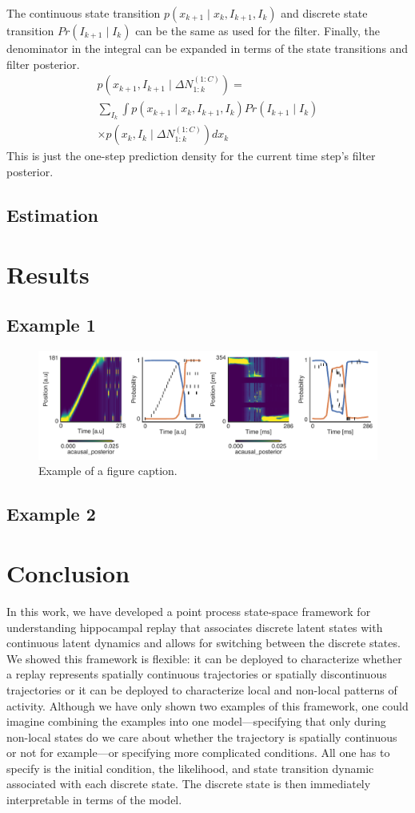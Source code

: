 \documentclass[conference]{IEEEtran}
\begin{document}
The continuous state transition $p(x_{k+1} \mid x_{k}, I_{k+1}, I_{k})$ and discrete state transition $Pr(I_{k+1} \mid I_{k})$ can be the same as used for the filter. Finally, the denominator in the integral can be expanded in terms of the state transitions and filter posterior.
\begin{multline}
p(x_{k+1}, I_{k+1} \mid \Delta N_{1:k}^{(1:C)}) = \\
\sum_{I_{k}} \int p(x_{k+1} \mid x_{k}, I_{k+1}, I_{k}) Pr(I_{k+1} \mid I_{k}) \\
\times p(x_{k}, I_{k} \mid \Delta N_{1:k}^{(1:C)}) dx_{k}
\end{multline}
This is just the one-step prediction density for the current time step's filter posterior.

\subsection{Estimation}
\section{Results}
\subsection{Example 1}
\begin{figure}[htbp]
\centerline{\includegraphics{fig1.pdf}}
\caption{Example of a figure caption.}
\label{fig}
\end{figure}
\subsection{Example 2}
\section{Conclusion}
In this work, we have developed a point process state-space framework for understanding hippocampal replay that associates discrete latent states with continuous latent dynamics and allows for switching between the discrete states. We showed this framework is flexible: it can be deployed to characterize whether a replay represents spatially continuous trajectories or spatially discontinuous trajectories or it can be deployed to characterize local and non-local patterns of activity. Although we have only shown two examples of this framework, one could imagine combining the examples into one model---specifying that only during non-local states do we care about whether the trajectory is spatially continuous or not for example---or specifying more complicated conditions. All one has to specify is the initial condition, the likelihood, and state transition dynamic associated with each discrete state. The discrete state is then immediately interpretable in terms of the model.
\end{document}
